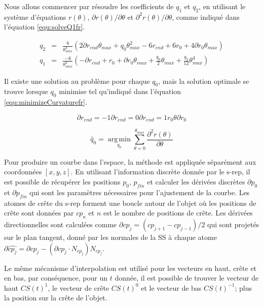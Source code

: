 Nous allons commencer par résoudre les coefficients de $q_1$ et $q_2$, en utilisant le système d'équations $r(\theta)$, $\partial r(\theta)/\partial \theta$ et $\partial^2 r(\theta)/\partial \theta$, comme indiqué dans l'équation \ref{equ:solveQ1fr}.

\begin{eqnarray} 
q_2 &=& \frac{6}{\theta_{max}^4} (2 \partial r_{end} \theta_{max} + q_0 \theta_{max}^2 - 6 r_{end} + 6 r_0 + 4 \partial r_0 \theta_{max}) \\
q_1 &=& \frac{-6}{\theta_{max}^3} (-\partial r_{end} + r_0 + \partial r_0 \theta_{max} +  \frac{q_0}{2} \theta_{max} + \frac{q_2}{12} \theta_{max}^4)
\label{equ:solveQ1fr}
\end{eqnarray} 

Il existe une solution au problème pour chaque $q_0$, mais la solution optimale se trouve lorsque $q_0$ minimise tel qu'indiqué dans l'équation \ref{equ:minimizeCurvaturefr}.

\begin{equation}
 \partial r_{end} =  -1 \partial r_{end} = 0 \partial r_{end} = 1 r_0 \theta \partial r_0
\end{equation}

\begin{equation}  
  \hat q_0 = \operatorname*{arg\,min}_{q_0} \sum_{\theta = 0}^{\theta_{max}} \frac{\partial^2 r(\theta)}{\partial \theta}
  \label{equ:minimizeCurvaturefr}
\end{equation}

Pour produire un courbe dans l'espace, la méthode est appliquée séparément aux coordonnées $[x, y, z]$.
En utilisant l'information discrète donnée par le s-rep,
il est possible de récupérer les positions $p_0$, $p_{fin}$ et calculer les dérivées discrètes 
$\partial p_0$ et $\partial p_{fin} $ qui sont les paramètres nécessaires pour l'ajustement de la courbe.
Les atomes de crête du s-rep forment une boucle autour de l’objet où les positions de crête sont données par $cp_n$ et $n$ est le nombre de positions de crête.
Les dérivées directionnelles sont calculées comme $\partial cp_j = (cp_{j + 1} - cp_{j - 1}) / 2$ qui sont projetés sur le plan tangent, donné par les normales de la SS à chaque atome $\partial \hat {cp_j} = \partial cp_j - (\partial cp_j \cdot N_ {cp_j}) N_ {cp_j} $.

Le même mécanisme d'interpolation est utilisé pour les vecteurs en haut, crête et en bas, par conséquence, pour un $t$ donnée, il est possible de trouver le vecteur de haut $CS(t)^1$, le vecteur de crête $CS(t)^0$ et le vecteur de bas $CS(t)^{-1}$; plus la position sur la crête de l'objet.


